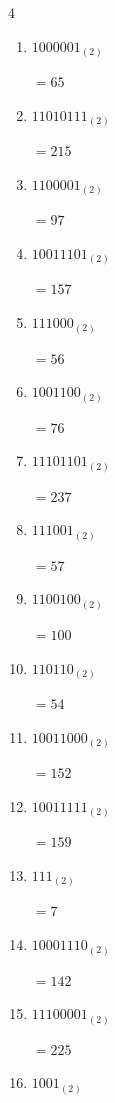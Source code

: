 \begin{multicols}{4}
\begin{enumerate}
        $=95$

  \item $1000001_{(2)}$

        $=65$

  \item $11010111_{(2)}$

        $=215$

  \item $1100001_{(2)}$

        $=97$

  \item $10011101_{(2)}$

        $=157$

  \item $111000_{(2)}$

        $=56$

  \item $1001100_{(2)}$

        $=76$

  \item $11101101_{(2)}$

        $=237$

  \item $111001_{(2)}$

        $=57$

  \item $1100100_{(2)}$

        $=100$

  \item $110110_{(2)}$

        $=54$

  \item $10011000_{(2)}$

        $=152$

\columnbreak %

  \item $10011111_{(2)}$

        $=159$

  \item $111_{(2)}$

        $=7$

  \item $10001110_{(2)}$

        $=142$

  \item $11100001_{(2)}$

        $=225$

  \item $1001_{(2)}$


\end{enumerate}
\end{multicols}
